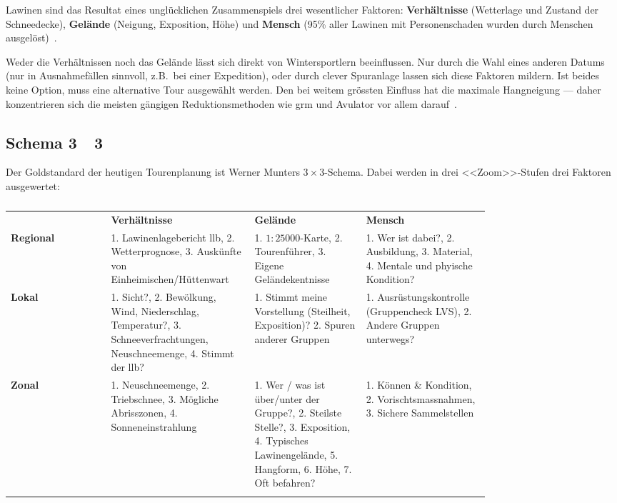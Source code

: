 Lawinen sind das Resultat eines unglücklichen Zusammenspiels drei wesentlicher Faktoren: 
\textbf{Verhältnisse} (Wetterlage und Zustand der Schneedecke), \textbf{Gelände} (Neigung, Exposition, Höhe) und \textbf{Mensch} (95\% aller Lawinen mit Personenschaden wurden durch Menschen ausgelöst)~\cite{ortovoxlabsnow}.

Weder die Verhältnissen noch das Gelände lässt sich direkt von Wintersportlern beeinflussen. Nur durch die Wahl eines anderen Datums (nur in Ausnahmefällen sinnvoll, z.B.\ bei einer Expedition), oder durch clever Spuranlage lassen sich diese Faktoren mildern. 
Ist beides keine Option, muss eine alternative Tour ausgewählt werden.
Den bei weitem grössten Einfluss hat die maximale Hangneigung --- daher konzentrieren sich die meisten gängigen Reduktionsmethoden wie \gls{grm} und Avulator vor allem darauf~\cite{arpddatasetdocs}\cite{harveyrhynerschweizerlawinenkunde}.
\clearpage
\subsection{Schema 3~\texttimes~3}
Der Goldstandard der heutigen Tourenplanung ist Werner Munters $3\times3$-Schema. Dabei werden in drei <<Zoom>>-Stufen drei Faktoren ausgewertet:


\begin{table}[hb] 
  \centering
  \begin{tabular}{|p{0.18\linewidth} | p{0.20\linewidth} | p{0.20\linewidth} | p{0.20\linewidth} |}
    \hhline{|----|}
   &  \textbf{Verhältnisse} & \textbf{Gelände} & \textbf{Mensch} \\
   \hhline{t:----:t}
  \textbf{Regional} &  1. Lawinenlagebericht \gls{llb}, 2. Wetterprognose, 3. Auskünfte von Einheimischen/Hüttenwart &  1. $1:25000$-Karte, 2. Tourenführer, 3. Eigene Geländekentnisse & 1. Wer ist dabei?, 2. Ausbildung, 3. Material, 4. Mentale und phyische Kondition?  \\ \hhline{|----|}
  \textbf{Lokal} & 1. Sicht?, 2. Bewölkung, Wind, Niederschlag, Temperatur?, 3. Schneeverfrachtungen, Neuschneemenge, 4. Stimmt der \gls{llb}? & 1. Stimmt meine Vorstellung (Steilheit, Exposition)? 2. Spuren anderer Gruppen & 1. Ausrüstungskontrolle (Gruppencheck LVS), 2. Andere Gruppen unterwegs? \\ \hhline{|----|}
  \textbf{Zonal} & 1. Neuschneemenge, 2. Triebschnee, 3. Mögliche Abrisszonen, 4. Sonneneinstrahlung & 1. Wer / was ist über/unter der Gruppe?, 2. Steilste Stelle?, 3. Exposition, 4. Typisches Lawinengelände, 5. Hangform, 6. Höhe, 7. Oft befahren? & 1. Können \& Kondition, 2. Vorischtsmassnahmen, 3. Sichere Sammelstellen \\
  \hhline{b:----:b}
  \end{tabular}
  \caption{}\label{tab:my-table}
\end{table}

